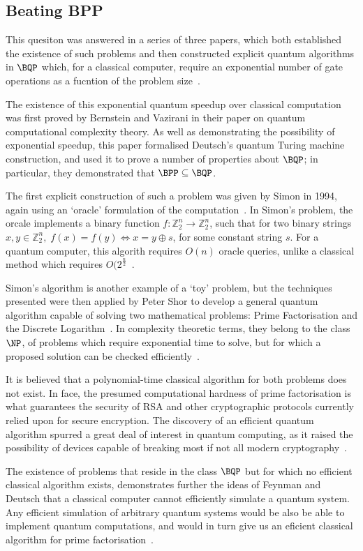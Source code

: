 \documentclass{standalone}
\begin{document}
\subsection{Beating BPP}\label{sec:exponentialspeedup}
This quesiton was answered in a series of three papers, which both established the existence of such problems and then constructed explicit quantum algorithms in $\BQP$ which, for a classical computer, require an exponential number of gate operations as a fucntion of the problem size~\cite{Bennett1997}.
\par
The existence of this exponential quantum speedup over classical computation was first proved by Bernstein and Vazirani in their paper on quantum computational complexity theory. As well as demonstrating the possibility of exponential speedup, this paper formalised Deutsch's quantum Turing machine construction, and used it to prove a number of properties about $\BQP$; in particular, they demonstrated that $\BPP\subseteq\BQP$.
\par
The first explicit construction of such a problem was given by Simon in 1994, again using an `oracle' formulation of the computation~\cite{Division1998a}. In Simon's problem, the orcale implements a binary function $f: \mathbb{Z}_{2}^{n}\rightarrow\mathbb{Z}_{2}^{n}$, such that for two binary strings $x,y\in\mathbb{Z}_{2}^{n},\;f(x)=f(y)\Leftrightarrow x = y \oplus s$, for some constant string $s$. For a quantum computer, this algorith requires $O(n)$ oracle queries, unlike a classical method which requires $O(2^{\frac{n}{2}}$~\cite{Division1998a}.
\par
Simon's algorithm is another example of a `toy' problem, but the techniques presented were then applied by Peter Shor to develop a general quantum algorithm capable of solving two mathematical problems: Prime Factorisation and the Discrete Logarithm~\cite{Division1998a,Shor1997}. In complexity theoretic terms, they belong to the class $\NP$, of problems which require exponential time to solve, but for which a proposed solution can be checked efficiently~\cite{Bennett1997}.
\par
It is believed that a polynomial-time classical algorithm for both problems does not exist. In face, the presumed computational hardness of prime factorisation is what guarantees the security of RSA and other cryptographic protocols currently relied upon for secure encryption. The discovery of an efficient quantum algorithm spurred a great deal of interest in quantum computing, as it raised the possibility of devices capable of breaking most if not all modern cryptography~\cite{Shor1997}. 
\par
The existence of problems that reside in the class $\BQP$ but for which no efficient classical algorithm exists, demonstrates further the ideas of Feynman and Deutsch that a classical computer cannot efficiently simulate a quantum system. Any efficient simulation of arbitrary quantum systems would be also be able to implement quantum computations, and would in turn give us an eficient classical algorithm for prime factorisation~\cite{Shor1997}.
\par
\end{document}
